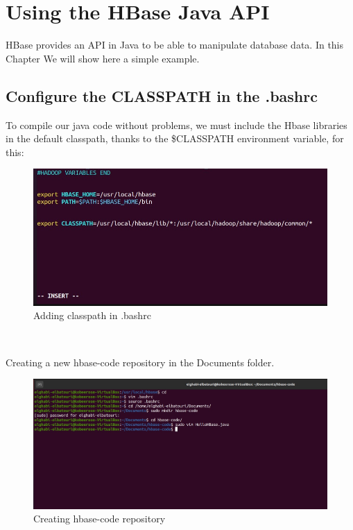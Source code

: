 \chapter{Using the HBase Java API}
\par HBase provides an API in Java to be able to manipulate database data. In this Chapter We will show here a
simple example.
\begin{spacing}{1.2}
\section{Configure the CLASSPATH in the .bashrc }
\par To compile our java code without problems, we must include the Hbase libraries in the default classpath,
thanks to the \$CLASSPATH environment variable, for this:
\\
\begin{figure}[!htb] 
\begin{center} 
\includegraphics[width=1\linewidth]{Pictures/HBase/Using the HBase Java API/Configure the CLASSPATH in the .bashrc/Adding classpath in .bashrc} 
\end{center} 
\caption{Adding classpath in .bashrc} 
\end{figure}  \FloatBarrier
\\
\newpage

\par Creating a new hbase-code repository in the Documents folder.
\\
\begin{figure}[!htb] 
\begin{center} 
\includegraphics[width=1\linewidth]{Pictures/HBase/Using the HBase Java API/Configure the CLASSPATH in the .bashrc/Creating hbase-code repository} 
\end{center} 
\caption{Creating hbase-code repository} 
\end{figure}  \FloatBarrier
\\


\end{spacing}
